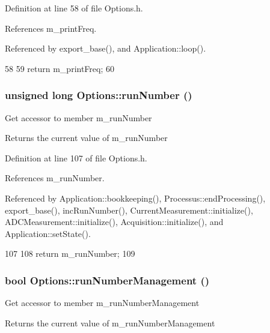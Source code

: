 Definition at line 58 of file Options.h.

References m\_\-printFreq.

Referenced by export\_\-base(), and Application::loop().


\begin{DoxyCode}
58                                    {
59                 return m_printFreq;
60         }
\end{DoxyCode}
\hypertarget{classOptions_a2d9447919fe90f9ce8df5530526cbb27}{
\subsubsection[{runNumber}]{\setlength{\rightskip}{0pt plus 5cm}unsigned long Options::runNumber ()}}
\label{classOptions_a2d9447919fe90f9ce8df5530526cbb27}
Get accessor to member m\_\-runNumber \begin{DoxyReturn}{Returns}
the current value of m\_\-runNumber 
\end{DoxyReturn}


Definition at line 107 of file Options.h.

References m\_\-runNumber.

Referenced by Application::bookkeeping(), Processus::endProcessing(), export\_\-base(), incRunNumber(), CurrentMeasurement::initialize(), ADCMeasurement::initialize(), Acquisition::initialize(), and Application::setState().


\begin{DoxyCode}
107                                    {
108                 return m_runNumber;
109         }
\end{DoxyCode}
\hypertarget{classOptions_a7654a2c3d67baae08f61edc18bec367e}{
\subsubsection[{runNumberManagement}]{\setlength{\rightskip}{0pt plus 5cm}bool Options::runNumberManagement ()}}
\label{classOptions_a7654a2c3d67baae08f61edc18bec367e}
Get accessor to member m\_\-runNumberManagement \begin{DoxyReturn}{Returns}
the current value of m\_\-runNumberManagement 
\end{DoxyReturn}


